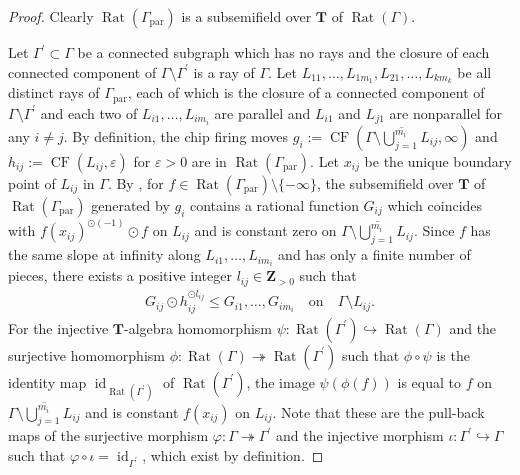 \documentclass[a4paper,12pt]{amsart}
\def\Gamma{\varGamma}
\begin{document}
\begin{proof}
Clearly $\operatorname{Rat}(\Gamma_{\operatorname{par}})$ is a subsemifield over $\boldsymbol{T}$ of $\operatorname{Rat}(\Gamma)$.

Let $\Gamma^{\prime} \subset \Gamma$ be a connected subgraph which has no rays and the closure of each connected component of $\Gamma \setminus \Gamma^{\prime}$ is a ray of $\Gamma$.
Let $L_{11}, \ldots, L_{1m_1}, L_{21}, \ldots, L_{km_k}$ be all distinct rays of $\Gamma_{\operatorname{par}}$, each of which is the closure of a connected component of $\Gamma \setminus \Gamma^{\prime}$ and each two of $L_{i1}, \ldots, L_{im_i}$ are parallel and $L_{i1}$ and $L_{j1}$ are nonparallel for any $i \not= j$.
By definition, the chip firing moves $g_i:= \operatorname{CF} \left(\overline{\Gamma \setminus \bigcup_{j = 1}^{m_i} L_{ij}}, \infty \right)$ and $h_{ij} := \operatorname{CF} \left( L_{ij}, \varepsilon \right)$ for $\varepsilon > 0$ are in $\operatorname{Rat}(\Gamma_{\operatorname{par}})$.
Let $x_{ij}$ be the unique boundary point of $L_{ij}$ in $\Gamma$.
By \cite[the proof of Lemma~1.4]{JuAe3}, for $f \in \operatorname{Rat}(\Gamma_{\operatorname{par}}) \setminus \{ -\infty \}$, the subsemifield over $\boldsymbol{T}$ of $\operatorname{Rat}(\Gamma_{\operatorname{par}})$ generated by $g_i$ contains a rational function $G_{ij}$ which coincides with $f(x_{ij})^{\odot (-1)} \odot f$ on $L_{ij}$ and is constant zero on $\overline{\Gamma \setminus \bigcup_{j = 1}^{m_i} L_{ij}}$.
Since $f$ has the same slope at infinity along $L_{i1}, \ldots, L_{im_i}$ and has only a finite number of pieces, there exists a positive integer $l_{ij} \in \boldsymbol{Z}_{>0}$ such that
\begin{align*}
G_{ij} \odot h_{ij}^{\odot l_{ij}} \le G_{i1}, \ldots, G_{im_i} \quad \text{on} \quad \Gamma \setminus L_{ij}.
\end{align*}
For the injective $\boldsymbol{T}$-algebra homomorphism $\psi : \operatorname{Rat}(\Gamma^{\prime}) \hookrightarrow \operatorname{Rat}(\Gamma)$ and the surjective homomorphism $\phi : \operatorname{Rat}(\Gamma) \twoheadrightarrow \operatorname{Rat}(\Gamma^{\prime})$ such that $\phi \circ \psi$ is the identity map $\operatorname{id}_{\operatorname{Rat}(\Gamma^{\prime})}$ of $\operatorname{Rat}(\Gamma^{\prime})$, the image $\psi(\phi(f))$ is equal to $f$ on $\overline{\Gamma \setminus \bigcup_{j = 1}^{m_i} L_{ij}}$ and is constant $f(x_{ij})$ on $L_{ij}$.
Note that these are the pull-back maps of the surjective morphism $\varphi : \Gamma \twoheadrightarrow \Gamma^{\prime}$ and the injective morphism $\iota : \Gamma^{\prime} \hookrightarrow \Gamma$ such that $\varphi \circ \iota = \operatorname{id}_{\Gamma^{\prime}}$, which exist by definition.

\end{proof}
\end{document}
